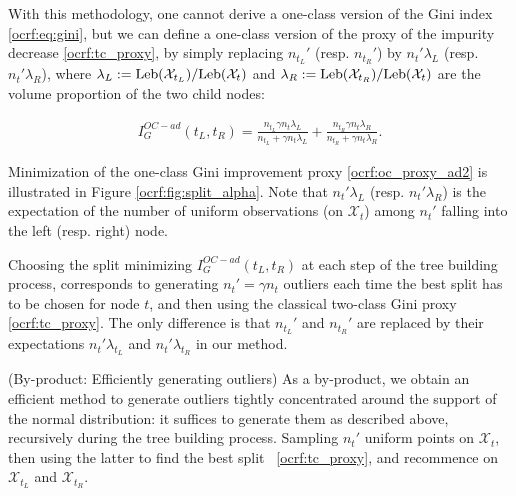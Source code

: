 With this methodology, one cannot derive a one-class version of the Gini index \eqref{ocrf:eq:gini}, but we can define a one-class version of the proxy of the impurity decrease \eqref{ocrf:tc_proxy}, by simply replacing $n_{t_L}'$ (resp. $n_{t_R}'$) by $n_t' \lambda_L$ (resp. $n_t' \lambda_R$), where $\lambda_L := \text{Leb}(\mathcal{X}_{t_L}) / \text{Leb}(\mathcal{X}_{t})$ and $\lambda_R := \text{Leb}(\mathcal{X}_{t_R}) / \text{Leb}(\mathcal{X}_{t})$ are the volume proportion of the two child nodes:

\begin{align}
\label{ocrf:oc_proxy_ad2}
I_G^{OC-ad}(t_L, t_R)= \frac{n_{t_L} \gamma n_t \lambda_L}{n_{t_L} + \gamma n_t \lambda_L} + \frac{n_{t_R} \gamma n_t \lambda_R}{n_{t_R} + \gamma n_t \lambda_R}.
\end{align}

Minimization of the one-class Gini improvement proxy \eqref{ocrf:oc_proxy_ad2} is illustrated in Figure \ref{ocrf:fig:split_alpha}. %
Note that $n_t'\lambda_L$ (resp. $n_t'\lambda_R$) is the expectation of the number of uniform  observations (on $\mathcal{X}_t$) among $n_t'$ falling into the left (resp. right) node.

Choosing the split minimizing $I_G^{OC-ad}(t_L, t_R)$ at each step of the tree building process, corresponds to generating $n_t' = \gamma n_t$ outliers each time the best split has to be chosen for node $t$, and then using the classical two-class Gini proxy \eqref{ocrf:tc_proxy}. The only difference is that $n_{t_L}'$ and $n_{t_R}'$ are replaced by their expectations $n_t'\lambda_{t_L}$ and $n_t'\lambda_{t_R}$ in our method.

\begin{remark}({\sc By-product: Efficiently generating outliers})
As a by-product, we obtain an efficient method to generate outliers tightly concentrated around the support of the normal distribution: it suffices to generate them as described above, recursively during the tree building process. Sampling $n_t'$ uniform points on $\mathcal{X}_t$, then using the latter to find the best split \wrt~\eqref{ocrf:tc_proxy}, and recommence on $\mathcal{X}_{t_L}$ and $\mathcal{X}_{t_R}$.
\end{remark}



